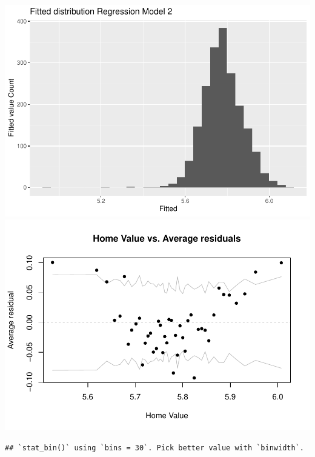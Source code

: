 \documentclass[
]{article}
\begin{document}
\includegraphics{final-writeup_files/figure-latex/unnamed-chunk-6-3.pdf}
\includegraphics{final-writeup_files/figure-latex/unnamed-chunk-6-4.pdf}

\begin{verbatim}
## `stat_bin()` using `bins = 30`. Pick better value with `binwidth`.
\end{verbatim}
\end{document}
